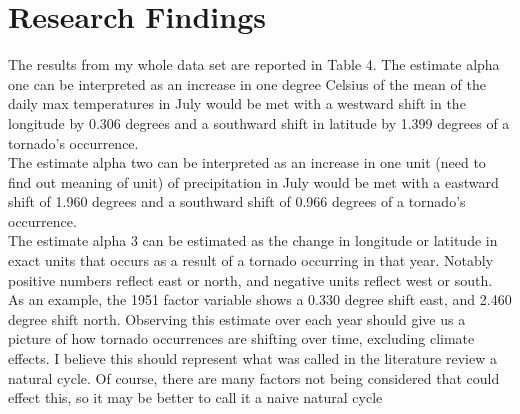 \documentclass[12pt,english]{article}
\begin{document}
\section{Research Findings}\label{sec:results}
The results from my whole data set are reported in Table 4.
The estimate alpha one can be interpreted as an increase in one degree Celsius of the mean of the daily max temperatures in July would be met with a westward shift in the longitude by 0.306 degrees and a southward shift in latitude by 1.399 degrees of a tornado's occurrence.\\
The estimate alpha two can be interpreted as an increase in one unit (need to find out meaning of unit) of precipitation in July would be met with a eastward shift of 1.960 degrees and a southward shift of 0.966 degrees of a tornado's occurrence.\\
The estimate alpha 3 can be estimated as the change in longitude or latitude in exact units that occurs as a result of a tornado occurring in that year. Notably positive numbers reflect east or north, and negative units reflect west or south. As an example, the 1951 factor variable shows a 0.330 degree shift east, and 2.460 degree shift north. Observing this estimate over each year should give us a picture of how tornado occurrences are shifting over time, excluding climate effects. I believe this should represent what was called in the literature review a natural cycle. Of course, there are many factors not being considered that could effect this, so it may be better to call it a naive natural cycle\\
\end{document}
